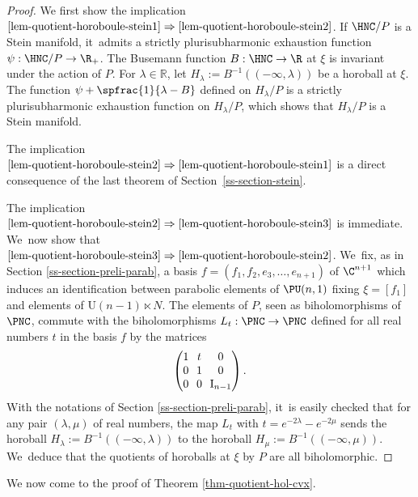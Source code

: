 \begin{proof}
We first show the implication $\eqref{lem-quotient-horoboule-stein1}\Rightarrow\eqref{lem-quotient-horoboule-stein2}$. If $\HNC/P$ is a Stein manifold, it~admits a strictly plurisubharmonic exhaustion function $\psi:\HNC/P\to \R_+$. The Busemann function $B:\HNC\to \R$ at $\xi$ is invariant under the action of $P$. For $\lambda\in\mathbb{R}$, let $H_{\lambda}:= B^{-1}((-\infty,\lambda))$ be a horoball at $\xi$. The function $\psi + \spfrac{1}{\lambda - B}$ defined on $H_{\lambda}/P$ is a strictly plurisubharmonic exhaustion function on $H_{\lambda}/P$, which shows that $H_{\lambda}/P$ is a Stein manifold.

The implication $\eqref{lem-quotient-horoboule-stein2}\Rightarrow\eqref{lem-quotient-horoboule-stein1}$ is a direct consequence of the last theorem of Section~\ref{ss-section-stein}.

The implication $\eqref{lem-quotient-horoboule-stein2}\Rightarrow\eqref{lem-quotient-horoboule-stein3}$ is immediate. We~now show that $\eqref{lem-quotient-horoboule-stein3}\Rightarrow\eqref{lem-quotient-horoboule-stein2}$. We~fix, as in Section \ref{ss-section-preli-parab}, a basis $f=(f_1,f_2,e_3,\dots,e_{n+1})$ of $\C^{n+1}$ which induces an identification between parabolic elements of $\PU(n,1)$ fixing $\xi=[f_1]$ and elements of $\mathrm{U}(n-1)\ltimes N$. The elements of $P$, seen as biholomorphisms of $\PNC$, commute with the biholomorphisms $L_t:\PNC\to \PNC$ defined for all real numbers $t$ in the basis $f$ by the matrices
\begin{equation*}
\arraycolsep3.5pt
\begin{pmatrix}
1 &t &0\\
0 &1 &0\\
0 &0 &\mathrm{I}_{n-1}
\end{pmatrix}.
\end{equation*}
With the notations of Section \ref{ss-section-preli-parab}, it~is easily checked that for any pair $(\lambda,\mu)$ of real numbers, the map $L_t$ with $t=e^{-2\lambda}-e^{-2\mu}$ sends the horoball $H_{\lambda}:=B^{-1}((-\infty,\lambda))$ to the horoball $H_{\mu}:=B^{-1}((-\infty,\mu))$. We~deduce that the quotients of horoballs at $\xi$ by $P$ are all biholomorphic.
\end{proof}

We now come to the proof of Theorem \ref{thm-quotient-hol-cvx}.

